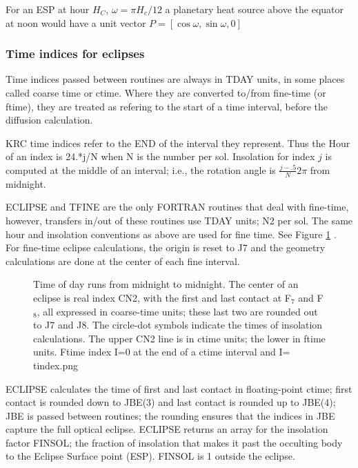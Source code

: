 \documentclass{article}
\begin{document}
For an ESP at hour $H_C$, $\omega=\pi H_c/12$ a planetary heat source above the
equator at noon would have a unit vector $P=[\cos \omega, \sin \omega, 0]$

\subsubsection{Time indices for eclipses}

Time indices passed between routines are always in TDAY units, in some places
called coarse time or ctime. Where they are converted to/from fine-time (or
ftime), they are treated as refering to the start of a time interval, before the
diffusion calculation.

KRC time indices refer to the END of the interval they represent. Thus the Hour
of an index is 24.*j/N when N is the number per sol. Insolation for index $j$ is
computed at the middle of an interval; i.e., the rotation angle is $
\frac{j-.5}{N}2 \pi$ from midnight.

ECLIPSE and TFINE are the only FORTRAN routines that deal with fine-time,
however, transfers in/out of these routines use TDAY units; N2 per sol. The same
hour and insolation conventions as above are used for fine time. See Figure
\ref{tindex} . For fine-time eclipse calculations, the origin is reset to J7 and
the geometry calculations are done at the center of each fine interval.

\begin{figure}[!ht] 
\caption[Diagram of time indices]{Time of day runs from midnight to
  midnight. The center of an eclipse is real index CN2, with the first and last
  contact at F$_7$ and F$_8$, all expressed in coarse-time units; these last two
  are rounded out to J7 and J8.  The circle-dot symbols indicate the times of
  insolation calculations. The upper CN2 line is in ctime units; the lower in
  ftime units. Ftime index I=0 at the end of a ctime interval and I= 
\label{tindex}  tindex.png }
\end{figure} 

ECLIPSE calculates the time of first and last contact in floating-point ctime;
first contact is rounded down to JBE(3) and last contact is rounded up to
JBE(4); JBE is passed between routines; the rounding ensures that the indices in
JBE capture the full optical eclipse. ECLIPSE returns an array for the
insolation factor FINSOL; the fraction of insolation that makes it past the
occulting body to the Eclipse Surface point (ESP).  FINSOL is 1 outside the
eclipse.
\end{document}

